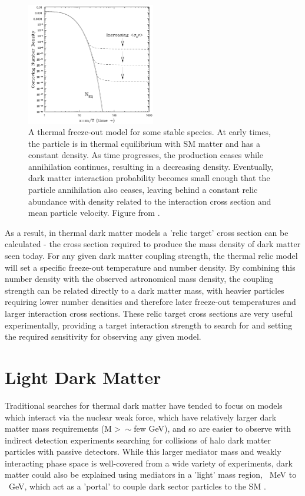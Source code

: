 \begin{figure}
	\label{fig:freezeout}
	\centering
	\includegraphics[width=0.5\textwidth]{figures/thermal_relic.png}
	\caption[Thermal Freeze-Out]{A thermal freeze-out model for some stable species. At early times, the particle is in thermal equilibrium with SM matter and has a constant density. As time progresses, the production ceases while annihilation continues, resulting in a decreasing density. Eventually, dark matter interaction probability becomes small enough that the particle annihilation also ceases, leaving behind a constant relic abundance with density related to the interaction cross section and mean particle velocity. Figure from \cite{hooper2009tasi}.}
\end{figure}

As a result, in thermal dark matter models a 'relic target' cross section can be calculated - the cross section required to produce the mass density of dark matter seen today.
For any given dark matter coupling strength, the thermal relic model will set a specific freeze-out temperature and number density.
By combining this number density with the observed astronomical mass density, the coupling strength can be related directly to a dark matter mass, with heavier particles requiring lower number densities and therefore later freeze-out temperatures and larger interaction cross sections.
These relic target cross sections are very useful experimentally, providing a target interaction strength to search for and setting the required sensitivity for observing any given model.

\section{Light Dark Matter}
Traditional searches for thermal dark matter have tended to focus on models which interact via the nuclear weak force, which have relatively larger dark matter mass requirements (M$>\sim$few GeV), and so are easier to observe with indirect detection experiments searching for collisions of halo dark matter particles with passive detectors.
While this larger mediator mass and weakly interacting phase space is well-covered from a wide variety of experiments, dark matter could also be explained using mediators in a 'light' mass region, ~MeV to ~GeV, which act as a 'portal' to couple dark sector particles to the SM \cite{darkSectors}.

